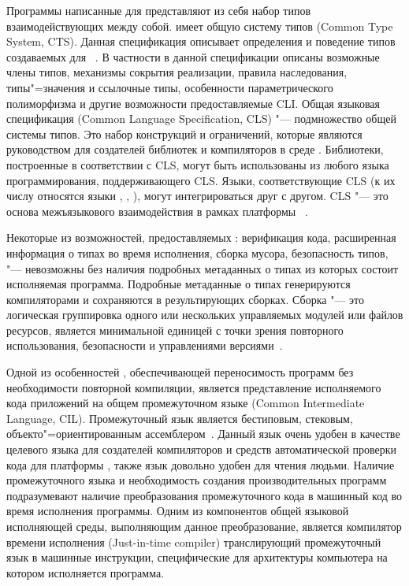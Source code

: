 Программы написанные для \dotnet{} представляют из себя набор типов взаимодействующих между собой.
\dotnet{} имеет общую систему типов (Common Type System, CTS).
Данная спецификация описывает определения и поведение типов создаваемых для \dotnet{}~\cite{richter_2012_en}.
В частности в данной спецификации описаны возможные члены типов, механизмы сокрытия реализации, правила наследования, типы"=значения и ссылочные типы, особенности параметрического полиморфизма и другие возможности предоставляемые CLI.
Общая языковая спецификация (Common Language Specification, CLS) "--- подмножество общей системы типов. 
Это набор конструкций и ограничений, которые являются руководством для создателей библиотек и компиляторов в среде \netfx{}.
Библиотеки, построенные в соответствии с CLS, могут быть использованы из любого языка программирования, поддерживающего CLS. 
Языки, соответствующие CLS (к их числу относятся языки \csharp{}, \vbnet{}, \cppcli{}), могут интегрироваться друг с другом. CLS "--- это основа межъязыкового взаимодействия в рамках платформы \dotnet{}~\cite{marchenko_2007}.

Некоторые из возможностей, предоставляемых \dotnet{}: верификация кода, расширенная информация о типах во время исполнения, сборка мусора, безопасность типов, "--- невозможны без наличия подробных метаданных о типах из которых состоит исполняемая программа.
Подробные метаданные о типах генерируются компиляторами и сохраняются в результирующих сборках.
Сборка "--- это логическая группировка одного или нескольких управляемых модулей или файлов ресурсов, является минимальной единицей с точки зрения повторного использования, безопасности и управлениями версиями~\cite[с.~6]{richter_2012_en}.

Одной из особенностей \dotnet{}, обеспечивающей переносимость программ без необходимости повторной компиляции, является представление исполняемого кода приложений на общем промежуточном языке (Common Intermediate Language, CIL). 
Промежуточный язык является бестиповым, стековым, объекто"=ориентированным ассемблером~\cite[с.~16\,--\,17]{richter_2012_en}.
Данный язык очень удобен в качестве целевого языка для создателей компиляторов и средств автоматической проверки кода для платформы \dotnet{}, также язык довольно удобен для чтения людьми.
Наличие промежуточного языка и необходимость создания производительных программ подразумевают наличие преобразования промежуточного кода в машинный код во время исполнения программы.
Одним из компонентов общей языковой исполняющей среды, выполняющим данное преобразование, является компилятор времени исполнения (Just-in-time compiler) транслирующий промежуточный язык в машинные инструкции, специфические для архитектуры компьютера на котором исполняется программа.

